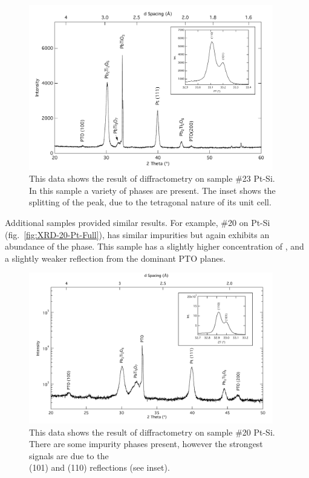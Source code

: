 \begin{figure}[htbp]
	\centering
	\includegraphics[width=0.95\textwidth]{./Figures/Data/XRD/Run-23-Pt/20-60}
	\caption[XRD Scan of \#23 on Pt]%
		{This data shows the result of diffractometry on sample \#23 Pt-Si. In this sample  a variety of phases %
		are present. The inset shows the splitting of the \PTO{} peak, due to the tetragonal nature of its %
		unit cell.}
	\label{fig:XRD-23-Pt-Full}
\end{figure}

Additional samples provided similar results. For example, \#20 on Pt-Si (fig.~\vref{fig:XRD-20-Pt-Full}), has similar impurities but again exhibits an abundance of the \PTO{} phase. This sample has a slightly higher concentration of , and a slightly weaker reflection from the dominant PTO planes. 

\begin{figure}[htbp]
	\centering
	\includegraphics[width=0.95\textwidth]{./Figures/Data/XRD/Run-20-Pt/20-50}
	\caption[XRD Scan of \#20 on Pt-SI]%
		{This data shows the result of diffractometry on sample \#20 Pt-Si. There are some impurity phases %
		present, however the strongest signals are due to the \\\PTO{} (101) and (110) reflections (see inset).}
	\label{fig:XRD-20-Pt-Full}
\end{figure}

